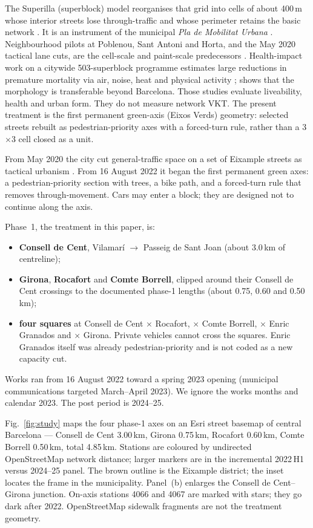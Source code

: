 \documentclass[a4paper,fleqn]{cas-dc}
\begin{document}
The Superilla (superblock) model reorganises that grid into cells of about
400\,m whose interior streets lose through-traffic and whose perimeter retains
the basic network \citep{Rueda2018}. It is an instrument of the municipal
\textit{Pla de Mobilitat Urbana} \citep{AjuntamentPMU2022}. Neighbourhood
pilots at Poblenou, Sant Antoni and Horta, and the May 2020 tactical lane
cuts, are the cell-scale and paint-scale predecessors
\citep{Scudellari2020,NelloDeakin2022}. Health-impact work on a citywide
503-superblock programme estimates large reductions in premature mortality
via air, noise, heat and physical activity \citep{Mueller2020};
\citet{Eggimann2022} shows that the morphology is transferable beyond
Barcelona. Those studies evaluate liveability, health and urban form. They
do not measure network VKT. The present treatment is the first permanent
green-axis (Eixos Verds) geometry: selected streets rebuilt as
pedestrian-priority axes with a forced-turn rule, rather than a 3$\times$3
cell closed as a unit.

From May 2020 the city cut general-traffic space on a set of Eixample streets
as tactical urbanism \citep{NelloDeakin2022}. From 16 August 2022 it began the
first permanent green axes: a pedestrian-priority section with trees, a bike
path, and a forced-turn rule that removes through-movement. Cars may enter a
block; they are designed not to continue along the axis.

Phase~1, the treatment in this paper, is:
\begin{itemize}
\item \textbf{Consell de Cent}, Vilamar\'i $\to$ Passeig de Sant Joan (about
3.0\,km of centreline);
\item \textbf{Girona}, \textbf{Rocafort} and \textbf{Comte Borrell}, clipped
around their Consell de Cent crossings to the documented phase-1 lengths
(about 0.75, 0.60 and 0.50\,km);
\item \textbf{four squares} at Consell de Cent $\times$ Rocafort, $\times$
Comte Borrell, $\times$ Enric Granados and $\times$ Girona. Private vehicles
cannot cross the squares. Enric Granados itself was already
pedestrian-priority and is not coded as a new capacity cut.
\end{itemize}

Works ran from 16 August 2022 toward a spring 2023 opening (municipal
communications targeted March--April 2023). We ignore the works months and
calendar 2023. The post period is 2024--25.

Fig.~\ref{fig:study} maps the four phase-1 axes on an Esri street
basemap of central Barcelona --- Consell de Cent 3.00\,km, Girona 0.75\,km,
Rocafort 0.60\,km, Comte Borrell 0.50\,km, total 4.85\,km. Stations are
coloured by undirected OpenStreetMap network distance; larger markers are in
the incremental 2022\,H1 versus 2024--25 panel. The brown outline is the
Eixample district; the inset locates the frame in the municipality.
Panel~(b) enlarges the Consell de Cent--Girona junction. On-axis stations
4066 and 4067 are marked with stars; they go dark after 2022. OpenStreetMap sidewalk
fragments are not the treatment geometry.
\end{document}
